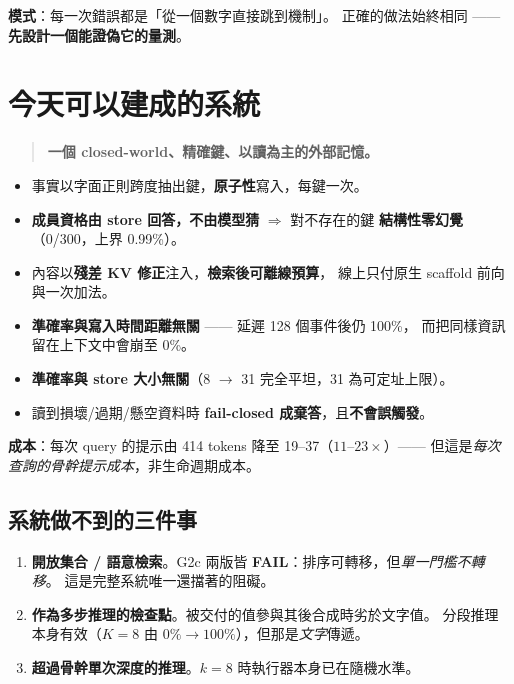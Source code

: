 \documentclass[11pt, a4paper]{article}
\newcommand{\FAIL}{\textcolor{red!70!black}{\textbf{FAIL}}}
\begin{document}
\textbf{模式}：每一次錯誤都是「從一個數字直接跳到機制」。
正確的做法始終相同 —— \textbf{先設計一個能證偽它的量測}。

\section{今天可以建成的系統}

\begin{quote}
\textbf{一個 closed-world、精確鍵、以讀為主的外部記憶。}
\end{quote}

\begin{itemize}
  \item 事實以字面正則跨度抽出鍵，\textbf{原子性}寫入，每鍵一次。
  \item \textbf{成員資格由 store 回答，不由模型猜} $\Rightarrow$ 對不存在的鍵
        \textbf{結構性零幻覺}（0/300，上界 0.99\%）。
  \item 內容以\textbf{殘差 KV 修正}注入，\textbf{檢索後可離線預算}，
        線上只付原生 scaffold 前向與一次加法。
  \item \textbf{準確率與寫入時間距離無關} —— 延遲 128 個事件後仍 100\%，
        而把同樣資訊留在上下文中會崩至 0\%。
  \item \textbf{準確率與 store 大小無關}（8 $\to$ 31 完全平坦，31 為可定址上限）。
  \item 讀到損壞/過期/懸空資料時 \textbf{fail-closed 成棄答}，且\textbf{不會誤觸發}。
\end{itemize}

\textbf{成本}：每次 query 的提示由 414 tokens 降至 19--37（$11$--$23\times$）——
但這是\emph{每次查詢的骨幹提示成本}，非生命週期成本。

\subsection{系統做不到的三件事}

\begin{enumerate}
  \item \textbf{開放集合 / 語意檢索}。G2c 兩版皆 \FAIL{}：排序可轉移，但\emph{單一門檻不轉移}。
        這是完整系統唯一還擋著的阻礙。
  \item \textbf{作為多步推理的檢查點}。被交付的值參與其後合成時劣於文字值。
        分段推理本身有效（$K{=}8$ 由 $0\% \to 100\%$），但那是\emph{文字}傳遞。
  \item \textbf{超過骨幹單次深度的推理}。$k{=}8$ 時執行器本身已在隨機水準。
\end{enumerate}
\end{document}
